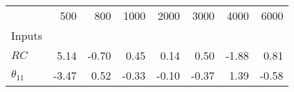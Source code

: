 \begin{tabular}{lrrrrrrr}
\toprule
{} &  500  &  800  &  1000 &  2000 &  3000 &  4000 &  6000 \\
Inputs        &       &       &       &       &       &       &       \\
\midrule
$RC$          &  5.14 & -0.70 &  0.45 &  0.14 &  0.50 & -1.88 &  0.81 \\
$\theta_{11}$ & -3.47 &  0.52 & -0.33 & -0.10 & -0.37 &  1.39 & -0.58 \\
\bottomrule
\end{tabular}
